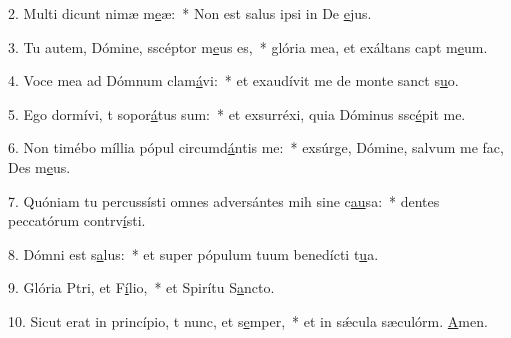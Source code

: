 2. Multi dicunt nimæ m\uline{e}æ:~* Non est salus ipsi in De \uline{e}jus.\par 
3. Tu autem, Dómine, sscéptor m\uline{e}us es,~* glória mea, et exáltans capt m\uline{e}um.\par 
4. Voce mea ad Dómnum clam\uline{á}vi:~* et exaudívit me de monte sanct s\uline{u}o.\par 
5. Ego dormívi, t sopor\uline{á}tus sum:~* et exsurréxi, quia Dóminus ssc\uline{é}pit me.\par 
6. Non timébo míllia pópul circumd\uline{á}ntis me:~* exsúrge, Dómine, salvum me fac, Des m\uline{e}us.\par 
7. Quóniam tu percussísti omnes adversántes mih sine c\uline{au}sa:~* dentes peccatórum contrv\uline{í}sti.\par 
8. Dómni est s\uline{a}lus:~* et super pópulum tuum benedícti t\uline{u}a.\par 
9. Glória Ptri, et F\uline{í}lio,~* et Spirítu S\uline{a}ncto.\par 
10. Sicut erat in princípio, t nunc, et s\uline{e}mper,~* et in sǽcula sæculórm. \uline{A}men.\par 
